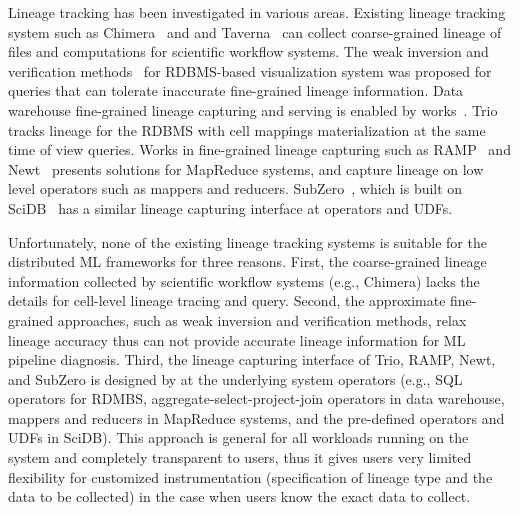 \documentclass{sig-alternate}
\begin{document}
Lineage tracking has been investigated in various areas.
Existing lineage tracking system such as Chimera~\cite{foster02} and and Taverna~\cite{oinn02} can collect coarse-grained lineage 
of files and computations for scientific workflow systems.
The weak inversion and verification methods~\cite{woodruff97} for RDBMS-based visualization system 
was proposed for queries that can tolerate inaccurate fine-grained lineage information.
Data warehouse fine-grained lineage capturing and serving is enabled by works~\cite{cui00, cui03}.
Trio~\cite{widom04} tracks lineage for the RDBMS with cell mappings materialization at the same time of view queries.
Works in fine-grained lineage capturing such as RAMP~\cite{ikeda11, park11} and Newt~\cite{logothetis13} presents
solutions for MapReduce systems, and capture lineage on low level operators such as mappers and reducers.
SubZero~\cite{wu13}, which is built on SciDB~\cite{brown10} has a similar lineage capturing interface at operators and UDFs.

Unfortunately, none of the existing lineage tracking systems is suitable for the distributed ML frameworks for three reasons.
First, the coarse-grained lineage information collected by scientific workflow systems (e.g., Chimera) lacks the details for cell-level lineage tracing and query.
Second, the approximate fine-grained approaches, such as weak inversion and verification methods, 
relax lineage accuracy thus can not provide accurate lineage information for ML pipeline diagnosis.
Third, the lineage capturing interface of Trio, RAMP, Newt, and SubZero is designed by at
the underlying system operators (e.g., SQL operators for RDMBS, aggregate-select-project-join operators in data warehouse, 
mappers and reducers in MapReduce systems, and the pre-defined operators and UDFs in SciDB). 
This approach is general for all workloads running on the system and completely transparent to users, 
thus it gives users very limited flexibility for customized instrumentation (specification of lineage type and the data to be collected) 
in the case when users know the exact data to collect.
\end{document}
